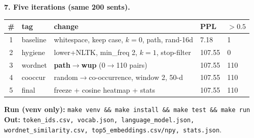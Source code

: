\documentclass[11pt,a4paper]{article}
\begin{document}
\textbf{7. Five iterations (same 200 sents).}
\begin{center}\begin{tabular}{cllll}\toprule\# & tag & change & PPL & $>0.5$ \\\midrule
1 & baseline & whitespace, keep case, $k{=}0$, path, rand-16d & 7.18 & 1 \\
2 & hygiene & lower+NLTK, min\_freq 2, $k{=}1$, stop-filter & 107.55 & 0 \\
3 & wordnet & \textbf{path$\to$wup} (0$\to$110 pairs) & 107.55 & 110 \\
4 & cooccur & random$\to$co-occurrence, window 2, 50-d & 107.55 & 110 \\
5 & final & freeze + cosine heatmap + stats & 107.55 & 110 \\\bottomrule\end{tabular}\end{center}
{\small \textbf{Run (venv only):} \texttt{make venv \&\& make install \&\& make test \&\& make run} \quad
\textbf{Out:} \texttt{token\_ids.csv, vocab.json, language\_model.json, wordnet\_similarity.csv, top5\_embeddings.csv/npy, stats.json}.}
\end{document}
